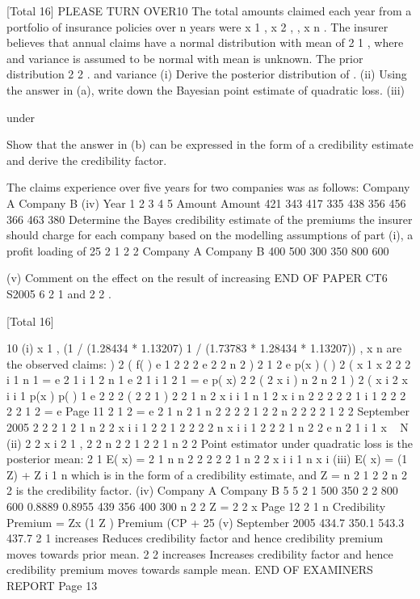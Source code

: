 \documentclass[a4paper,12pt]{article}
\begin{document}
 


[Total 16]
PLEASE TURN OVER10
The total amounts claimed each year from a portfolio of insurance policies over n
years were x 1 , x 2 , , x n . The insurer believes that annual claims have a normal
distribution with mean
of
2
1 , where
and variance
is assumed to be normal with mean
is unknown. The prior distribution
2
2 .
and variance
(i) Derive the posterior distribution of .
(ii) Using the answer in (a), write down the Bayesian point estimate of
quadratic loss.
(iii)

under

Show that the answer in (b) can be expressed in the form of a credibility
estimate and derive the credibility factor.

The claims experience over five years for two companies was as follows:
Company A
Company B
(iv)
Year 1 2 3 4 5
Amount
Amount 421
343 417
335 438
356 456
366 463
380
Determine the Bayes credibility estimate of the premiums the insurer should
charge for each company based on the modelling assumptions of part (i), a
profit loading of 25%
2
1
2
2
Company A Company B
400
500 300
350
800 600

(v)
Comment on the effect on the result of increasing
END OF PAPER
CT6 S2005
6
2
1 and
2
2 .

[Total 16]


10
(i)
x 1 ,
(1 / (1.28434 * 1.13207)
1 / (1.73783 * 1.28434 * 1.13207))
, x n are the observed claims:
) 2
(
f( )
e
1
2
2
2
e
2 2
n 2
)
2
1
2
e
p(x )
(
) 2
( x 1
x
2
2
2
i 1
n
1
= e
2
1 i 1
2
n
1
e
2
1 i 1
2
1
= e
p( x)
2
2
(
2 x i )
n
2
n
2
1
) 2
( x i
2
x i
i 1
p(x ) p( )
1
e
2
2
2
(
2
2
1
)
2
2
1
n
2
x i
i 1
n
1
2
x i
n
2
2
2
2
2
1
i 1
2
2
2
2
2
1
2
= e
Page 11%
2
1
2
= e
2
1
n
2
1
n 2 2
2 2
1 2
2
n 2 2
2 2
1 2
2
September 2005
2
2
2
1
2
1
n
2
2
x i
i 1
2 2
1 2
2
2
2
n
x i
i 1
2
2
2
1
n
2
2
e
n
2
1
i 1
x ~ N
(ii)
2
2
x i
2
1
,
2
2
n
2 2
1 2
2
1
n
2
2
Point estimator under quadratic loss is the posterior mean:
2
1
E( x) =
2
1
n
n
2
2
2
2
2
1
n
2
2
x i
i 1
n
x i
(iii)
E( x) = (1
Z)
+ Z
i 1
n
which is in the form of a credibility estimate, and
Z =
n
2
1
2
2
n
2
2
is the credibility factor.
(iv)
Company A Company B
5 5
2
1 500 350
2
2 800 600
0.8889 0.8955
439 356
400 300
n
2
2
Z =
2
2
x
Page 12
2
1
n%
Credibility Premium
= Zx (1 Z )
Premium (CP + 25%
(v)
September 2005
434.7 350.1
543.3 437.7
2
1 increases Reduces credibility factor and hence credibility premium
moves towards prior mean.
2
2 increases Increases credibility factor and hence credibility premium
moves towards sample mean.
END OF EXAMINERS REPORT
Page 13
\end{document}
